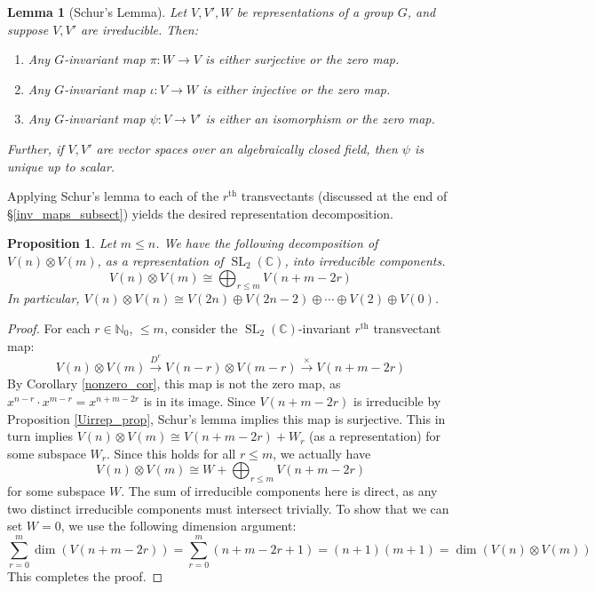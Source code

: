 \documentclass{article}
\newtheorem{lemma}[theorem]{Lemma}
\newtheorem{proposition}[theorem]{Proposition}
\theoremstyle{definition}
\theoremstyle{plain}
\newcommand{\C}{\mathbb{C}}
\newcommand{\N}{\mathbb{N}}
\DeclareMathOperator{\SL}{SL}
\begin{document}
\begin{lemma}[Schur's Lemma]
    Let $V,V',W$ be representations of a group $G$, and suppose $V,V'$ are irreducible. Then:
    \begin{enumerate}[label=(\roman*)]
        \item Any $G$-invariant map $\pi: W \rightarrow V$ is either surjective or the zero map.
        \item Any $G$-invariant map $\iota: V \rightarrow W$ is either injective or the zero map.
        \item Any $G$-invariant map $\psi: V \rightarrow V'$ is either an isomorphism or the zero map.
    \end{enumerate}
    Further, if $V,V'$ are vector spaces over an algebraically closed field, then $\psi$ is unique up to scalar.
\end{lemma}

Applying Schur's lemma to each of the $r^\text{th}$ transvectants (discussed at the end of \S\ref{inv_maps_subsect}) yields the desired representation decomposition.

\begin{proposition}\label{Utensor_prop}
    Let $m \leq n$. We have the following decomposition of $V(n) \otimes V(m)$, as a representation of $\SL_2(\C)$, into irreducible components.
    \[
        V(n) \otimes V(m) \cong \bigoplus_{r \leq m} V(n + m - 2r)
    \]
    In particular, $V(n) \otimes V(n) \cong V(2n) \oplus V(2n-2) \oplus \cdots \oplus V(2) \oplus V(0)$.
\end{proposition}
\begin{proof}
    For each $r \in \N_0$, $ \leq m$, consider the $\SL_2(\C)$-invariant $r^\text{th}$ transvectant map:
    \[
        V(n) \otimes V(m) \xrightarrow{D^r} V(n-r) \otimes V(m-r) \xrightarrow{\times} V(n+m-2r)
    \]
    By Corollary \ref{nonzero_cor}, this map is not the zero map, as $x^{n-r} \cdot x^{m-r} = x^{n+m-2r}$ is in its image. Since $V(n+m-2r)$ is irreducible by Proposition \ref{Uirrep_prop}, Schur's lemma implies this map is surjective. This in turn implies $V(n) \otimes V(m) \cong V(n+m-2r) + W_r$ (as a representation) for some subspace $W_r$. Since this holds for all $r \leq m$, we actually have
    \[
        V(n) \otimes V(m) \cong W + \bigoplus_{r \leq m} V(n + m - 2r)
    \]
    for some subspace $W$. The sum of irreducible components here is direct, as any two distinct irreducible components must intersect trivially. To show that we can set $W = 0$, we use the following dimension argument:
    \[
        \sum_{r=0}^m \dim(V(n+m-2r)) = \sum_{r=0}^m (n+m-2r+1) = (n+1)(m+1) = \dim(V(n) \otimes V(m))
    \]
    This completes the proof.
\end{proof}
\end{document}
